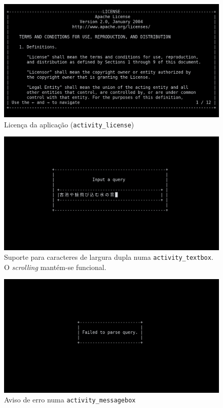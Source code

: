\documentclass[11pt, a4paper]{article}
\begin{document}
\begin{figure}[H]
    \centering
    \includegraphics[scale=0.25]{res-fase2/interactive_screenshots/license.png}
    \caption{Licença da aplicação (\texttt{activity\_license})}
    \label{fig:license}
\end{figure}

\begin{figure}[H]
    \centering
    \includegraphics[scale=0.25]{res-fase2/interactive_screenshots/japanese.png}
    \caption{Suporte para caracteres de largura dupla numa \texttt{activity\_textbox}.
             O \emph{scrolling} mantém-se funcional.}
    \label{fig:japanese}
\end{figure}

\begin{figure}[H]
    \centering
    \includegraphics[scale=0.25]{res-fase2/interactive_screenshots/messagebox.png}
    \caption{Aviso de erro numa \texttt{activity\_messagebox}}
    \label{fig:messagebox}
\end{figure}
\end{document}
